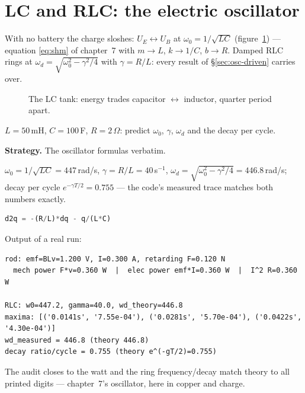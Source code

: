 \section{LC and RLC: the electric oscillator}\label{sec:far-lc}

With no battery the charge sloshes: $U_E\leftrightarrow U_B$ at
$\omega_0=1/\sqrt{LC}$ (figure~\ref{fig:slosh}) --- equation
\eqref{eq:shm} of chapter~7 with $m\to L$, $k\to1/C$, $b\to R$.
Damped RLC rings at $\omega_d=\sqrt{\omega_0^{2}-\gamma^{2}/4}$ with
$\gamma=R/L$: every result of \S\ref{sec:osc-driven} carries over.

\begin{figure}[htbp]\centering

\caption{The LC tank: energy trades capacitor $\leftrightarrow$
inductor, quarter period apart.}
\label{fig:slosh}
\end{figure}

\begin{example}\label{ex:rlc}
$L=50$\,mH, $C=100$\,\textmu F, $R=2\,\Omega$: predict $\omega_0$,
$\gamma$, $\omega_d$ and the decay per cycle.
\par\smallskip
\textbf{Strategy.} The oscillator formulas verbatim.
\begin{solution}
$\omega_0=1/\sqrt{LC}=447$\,rad/s, $\gamma=R/L=40$\,s$^{-1}$,
$\omega_d=\sqrt{\omega_0^{2}-\gamma^{2}/4}=446.8$\,rad/s;
decay per cycle $e^{-\gamma T/2}=0.755$ --- the code's measured trace
matches both numbers exactly. \checkmark
\end{solution}
\end{example}

\begin{lstlisting}[language=Python,caption={\texttt{code/ch14\_rlc.py} --- rod audit + RLC ringing vs theory.},label={lst:rlc}]
d2q = -(R/L)*dq - q/(L*C)
\end{lstlisting}

Output of a real run:
\begin{lstlisting}[numbers=none]
rod: emf=BLv=1.200 V, I=0.300 A, retarding F=0.120 N
  mech power F*v=0.360 W  |  elec power emf*I=0.360 W  |  I^2 R=0.360 W

RLC: w0=447.2, gamma=40.0, wd_theory=446.8
maxima: [('0.0141s', '7.55e-04'), ('0.0281s', '5.70e-04'), ('0.0422s', '4.30e-04')]
wd_measured = 446.8 (theory 446.8)
decay ratio/cycle = 0.755 (theory e^(-gT/2)=0.755)
\end{lstlisting}

The audit closes to the watt and the ring frequency/decay match theory
to all printed digits --- chapter~7's oscillator, here in copper and
charge.

